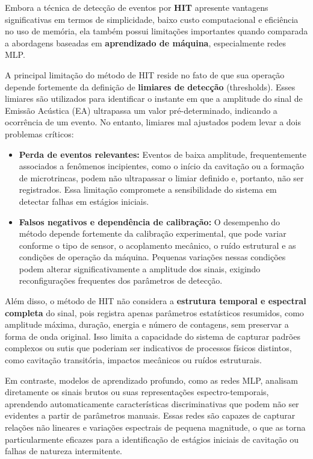 Embora a técnica de detecção de eventos por \textbf{HIT} apresente vantagens significativas em termos de simplicidade, baixo custo computacional e eficiência no uso de memória, ela também possui limitações importantes quando comparada a abordagens baseadas em \textbf{aprendizado de máquina}, especialmente redes MLP.

A principal limitação do método de HIT reside no fato de que sua operação depende fortemente da definição de \textbf{limiares de detecção} (thresholds). Esses limiares são utilizados para identificar o instante em que a amplitude do sinal de Emissão Acústica (EA) ultrapassa um valor pré-determinado, indicando a ocorrência de um evento. No entanto, limiares mal ajustados podem levar a dois problemas críticos:

\begin{itemize}
    \item \textbf{Perda de eventos relevantes:}  
    Eventos de baixa amplitude, frequentemente associados a fenômenos incipientes, como o início da cavitação ou a formação de microtrincas, podem não ultrapassar o limiar definido e, portanto, não ser registrados. Essa limitação compromete a sensibilidade do sistema em detectar falhas em estágios iniciais.

    \item \textbf{Falsos negativos e dependência de calibração:}  
    O desempenho do método depende fortemente da calibração experimental, que pode variar conforme o tipo de sensor, o acoplamento mecânico, o ruído estrutural e as condições de operação da máquina. Pequenas variações nessas condições podem alterar significativamente a amplitude dos sinais, exigindo reconfigurações frequentes dos parâmetros de detecção.
\end{itemize}

Além disso, o método de HIT não considera a \textbf{estrutura temporal e
	espectral completa} do sinal, pois registra apenas parâmetros estatísticos
resumidos, como amplitude máxima, duração, energia e número de contagens, sem
preservar a forma de onda original. Isso limita a capacidade do sistema de
capturar padrões complexos ou sutis que poderiam ser indicativos de processos
físicos distintos, como cavitação transitória, impactos mecânicos ou ruídos
estruturais.

Em contraste, modelos de aprendizado profundo, como as redes MLP, analisam
diretamente os sinais brutos ou suas representações espectro-temporais,
aprendendo automaticamente características discriminativas que podem não ser
evidentes a partir de parâmetros manuais. Essas redes são capazes de capturar
relações não lineares e variações espectrais de pequena magnitude, o que as torna
particularmente eficazes para a identificação de estágios iniciais de cavitação
ou falhas de natureza intermitente.

